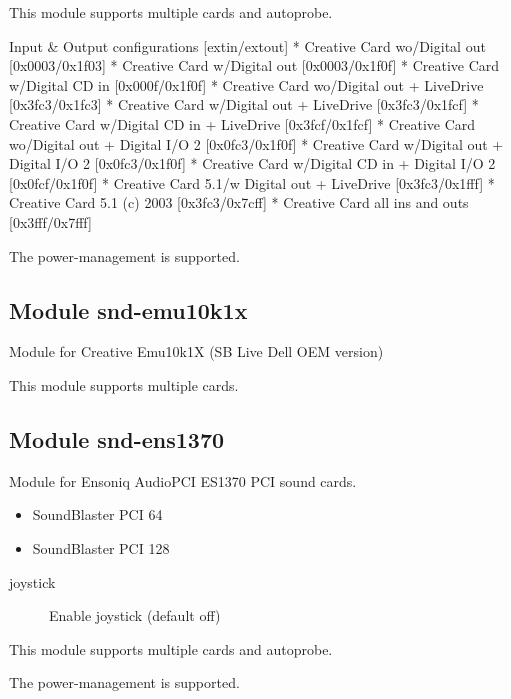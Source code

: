 \documentclass[a4paper,8pt,english]{sphinxmanual}
\begin{document}
This module supports multiple cards and autoprobe.

Input \& Output configurations                   {[}extin/extout{]}
* Creative Card wo/Digital out                  {[}0x0003/0x1f03{]}
* Creative Card w/Digital out                   {[}0x0003/0x1f0f{]}
* Creative Card w/Digital CD in                 {[}0x000f/0x1f0f{]}
* Creative Card wo/Digital out + LiveDrive      {[}0x3fc3/0x1fc3{]}
* Creative Card w/Digital out + LiveDrive       {[}0x3fc3/0x1fcf{]}
* Creative Card w/Digital CD in + LiveDrive     {[}0x3fcf/0x1fcf{]}
* Creative Card wo/Digital out + Digital I/O 2  {[}0x0fc3/0x1f0f{]}
* Creative Card w/Digital out + Digital I/O 2   {[}0x0fc3/0x1f0f{]}
* Creative Card w/Digital CD in + Digital I/O 2 {[}0x0fcf/0x1f0f{]}
* Creative Card 5.1/w Digital out + LiveDrive   {[}0x3fc3/0x1fff{]}
* Creative Card 5.1 (c) 2003                    {[}0x3fc3/0x7cff{]}
* Creative Card all ins and outs                {[}0x3fff/0x7fff{]}

The power-management is supported.


\subsection{Module snd-emu10k1x}
\label{sound/alsa-configuration:module-snd-emu10k1x}
Module for Creative Emu10k1X (SB Live Dell OEM version)

This module supports multiple cards.


\subsection{Module snd-ens1370}
\label{sound/alsa-configuration:module-snd-ens1370}
Module for Ensoniq AudioPCI ES1370 PCI sound cards.
\begin{itemize}
\item {} 
SoundBlaster PCI 64

\item {} 
SoundBlaster PCI 128

\end{itemize}
\begin{description}
\item[{joystick}] \leavevmode
Enable joystick (default off)

\end{description}

This module supports multiple cards and autoprobe.

The power-management is supported.
\end{document}
